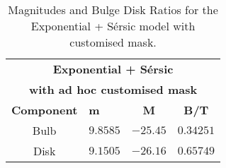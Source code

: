 \begin{table}[!htb]
    \renewcommand{\thetable}{S4}
    \centering
    \begin{tabular}{|c|l|c|c|}
        \hline
        \multicolumn{4}{|c|}{\textbf{Exponential + Sérsic}} \\
      
        \multicolumn{4}{|c|}{\textbf{with ad hoc customised mask}} \\
        \hline
        \textbf{Component} & \textbf{m} & \textbf{M} & \textbf{B/T} \\
        \hline
        Bulb & \(9.8585\) & \(-25.45\) & \(0.34251\) \\
        \hline
        Disk & \(9.1505\) & \(-26.16\) & \(0.65749\) \\
        \hline
    \end{tabular}
    \caption{Magnitudes and Bulge Disk Ratios for the Exponential + Sérsic model with customised mask. }
\end{table}







